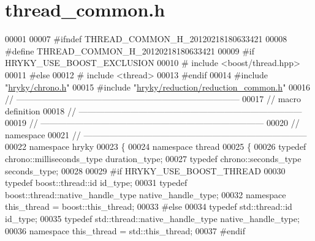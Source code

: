 \hypertarget{thread__common_8h_source}{\section{thread\-\_\-common.\-h}
}

\begin{DoxyCode}
00001 
00007 \textcolor{preprocessor}{#ifndef THREAD\_COMMON\_H\_20120218180633421}
00008 \textcolor{preprocessor}{}\textcolor{preprocessor}{#define THREAD\_COMMON\_H\_20120218180633421}
00009 \textcolor{preprocessor}{}\textcolor{preprocessor}{#if HRYKY\_USE\_BOOST\_EXCLUSION}
00010 \textcolor{preprocessor}{}\textcolor{preprocessor}{#   include <boost/thread.hpp>}
00011 \textcolor{preprocessor}{#else}
00012 \textcolor{preprocessor}{}\textcolor{preprocessor}{#   include <thread>}
00013 \textcolor{preprocessor}{#endif}
00014 \textcolor{preprocessor}{}\textcolor{preprocessor}{#include "\hyperlink{chrono_8h}{hryky/chrono.h}"}
00015 \textcolor{preprocessor}{#include "\hyperlink{reduction__common_8h}{hryky/reduction/reduction_common.h}"}
00016 \textcolor{comment}{//
      ------------------------------------------------------------------------------}
00017 \textcolor{comment}{// macro definition}
00018 \textcolor{comment}{//
      ------------------------------------------------------------------------------}
00019 \textcolor{comment}{//
      ------------------------------------------------------------------------------}
00020 \textcolor{comment}{// namespace}
00021 \textcolor{comment}{//
      ------------------------------------------------------------------------------}
00022 \textcolor{keyword}{namespace }hryky
00023 \{
00024 \textcolor{keyword}{namespace }thread
00025 \{
00026     \textcolor{keyword}{typedef} chrono::milliseconds\_type           duration\_type;
00027     \textcolor{keyword}{typedef} chrono::seconds\_type                seconds\_type;
00028     
00029 \textcolor{preprocessor}{#if HRYKY\_USE\_BOOST\_THREAD}
00030 \textcolor{preprocessor}{}    \textcolor{keyword}{typedef} boost::thread::id                   id\_type;
00031     \textcolor{keyword}{typedef} boost::thread::native\_handle\_type   native\_handle\_type;
00032     \textcolor{keyword}{namespace }this\_thread = boost::this\_thread;
00033 \textcolor{preprocessor}{#else}
00034 \textcolor{preprocessor}{}    \textcolor{keyword}{typedef} std::thread::id                     id\_type;
00035     \textcolor{keyword}{typedef} std::thread::native\_handle\_type     native\_handle\_type;
00036     \textcolor{keyword}{namespace }this\_thread = std::this\_thread;
00037 \textcolor{preprocessor}{#endif}

\end{DoxyCode}
